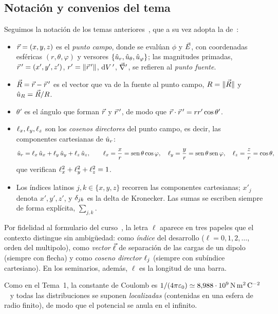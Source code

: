 \subsection{Notación y convenios del tema}\label{sec:notacion}
\begin{notacion}\label{not:puntos}
Seguimos la notación de los temas anteriores~\cite{TEMA0,TEMA1}, que a su vez adopta la de~\cite{NAVAS}:
\begin{itemize}
  \item $\vec{r}=(x,y,z)$ es el \emph{punto campo}, donde se evalúan $\phi$ y $\vec{E}$, con coordenadas esféricas $(r,\theta,\varphi)$ y
        versores $\{\hat{u}_{r},\hat{u}_{\theta},\hat{u}_{\varphi}\}$; las magnitudes primadas, $\vec{r}\,'=(x',y',z')$, $r'=\lVert \vec{r}\,'\rVert$, $\mathrm{d} V\,'$, $\vec{\nabla}'$, se refieren
        al \emph{punto fuente}.
  \item $\vec{R}=\vec{r}-\vec{r}\,'$ es el vector que va de la fuente al punto campo, $R=\lVert \vec{R}\rVert$ y $\hat{u}_{R}=\vec{R}/R$.
  \item $\theta'$ es el ángulo que forman $\vec{r}$ y $\vec{r}\,'$, de modo que $\vec{r}\cdot\vec{r}\,'=rr'\cos\theta'$.
  \item $\ell_{x},\ell_{y},\ell_{z}$ son los \emph{cosenos directores} del punto campo, es decir, las componentes cartesianas de $\hat{u}_{r}$:
        \[
          \hat{u}_{r}=\ell_{x}\,\hat{u}_{x}+\ell_{y}\,\hat{u}_{y}+\ell_{z}\,\hat{u}_{z},\qquad
          \ell_{x}=\frac{x}{r}=\operatorname{sen}\theta\cos\varphi,\quad \ell_{y}=\frac{y}{r}=\operatorname{sen}\theta\operatorname{sen}\varphi,\quad \ell_{z}=\frac{z}{r}=\cos\theta,
        \]
        que verifican $\ell_{x}^{2}+\ell_{y}^{2}+\ell_{z}^{2}=1$.
  \item Los índices latinos $j,k\in\{x,y,z\}$ recorren las componentes cartesianas; $x'_j$ denota $x',y',z'$, y $\delta_{jk}$ es la delta de
        Kronecker. Las sumas se escriben siempre de forma explícita, $\sum_{j,k}$.
\end{itemize}
\end{notacion}

\begin{observacion}\label{obs:ell}
Por fidelidad al formulario del curso~\cite{FORMULARIO}, la letra $\ell$ aparece en tres papeles que el contexto distingue sin ambigüedad:
como \emph{índice} del desarrollo ($\ell=0,1,2,\dots$, orden del multipolo), como \emph{vector} $\vec{\ell}$ de separación de las cargas de un
dipolo (siempre con flecha) y como \emph{coseno director} $\ell_{j}$ (siempre con subíndice cartesiano). En los seminarios, además, $\ell$ es
la longitud de una barra.
\end{observacion}

Como en el Tema~1, la constante de Coulomb es $1/(4\pi\varepsilon_{0})\simeq8{,}988\cdot10^{9}\,\mathrm{N\,m^{2}\,C^{-2}}$~\cite{CODATA} y todas las
distribuciones se suponen \emph{localizadas} (contenidas en una esfera de radio finito), de modo que el potencial se anula en el infinito.

